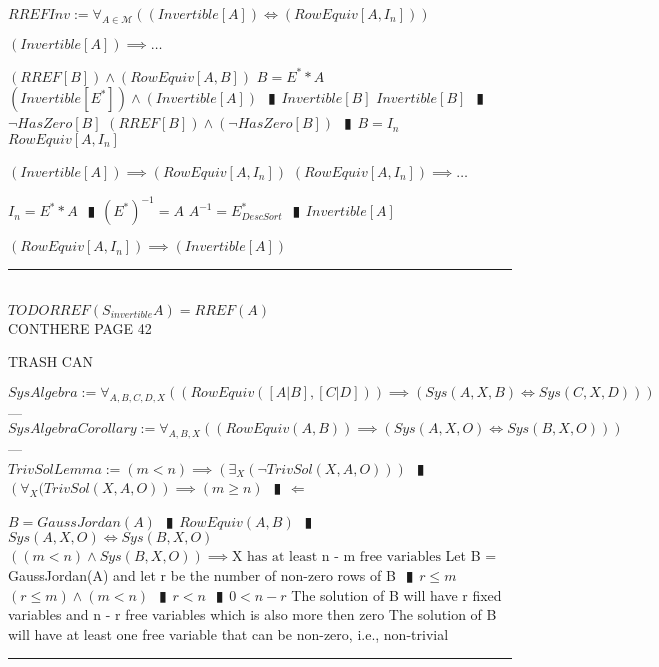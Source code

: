 \documentclass{book}
\newcommand{\abr}{:=}
\newcommand{\pipe}{$\phantom{(}\vrectangleblack\phantom{)}$}
\newcommand{\pr}[1]{\left(#1\right)}
\begin{document}
$RREFInv \abr \forall_{A \in \mathcal{M}}\pr{(Invertible[A]) \iff (RowEquiv[A, I_n])}$
\begin{enumerate}
  \lit $(Invertible[A]) \implies \ldots$
  \begin{enumerate}
    \lit $(RREF[B]) \land (RowEquiv[A, B])$
    \lit $B = E^* * A$
    \lit $(Invertible[E^*]) \land (Invertible[A])$ \pipe $Invertible[B]$
    \lit $Invertible[B]$ \pipe $\lnot HasZero[B]$
    \lit $(RREF[B]) \land (\lnot HasZero[B])$ \pipe $B = I_n$
    \lit $RowEquiv[A, I_n]$
  \end{enumerate}
  \lit $(Invertible[A]) \implies (RowEquiv[A, I_n])$
  \lit $(RowEquiv[A, I_n]) \implies \ldots$
  \begin{enumerate}
    \lit $I_n = E^* * A$ \pipe $(E^*)^{-1} = A$
    \lit $A^{-1} = E^*_{DescSort}$ \pipe $Invertible[A]$
  \end{enumerate}
  \lit $(RowEquiv[A, I_n]) \implies (Invertible[A])$
\end{enumerate} \vspace{.75mm} \hrule \vspace{.75mm} \ \\ 

$TODO RREF(S_{invertible} A) = RREF(A)$ \\

CONTHERE PAGE 42

TRASH CAN





$SysAlgebra \abr \forall_{A, B, C, D, X}\pr{\pr{RowEquiv([A|B], [C|D])} \implies \pr{Sys(A, X, B) \iff Sys(C, X, D)}}$    \phantom{TODO}--- \\
$SysAlgebraCorollary \abr \forall_{A, B, X}\pr{\pr{RowEquiv(A, B)} \implies \pr{Sys(A, X, O) \iff Sys(B, X, O)}}$    \phantom{TODO}--- \\
$TrivSolLemma \abr (m < n) \implies \pr{\exists_{X}\pr{\lnot TrivSol(X, A, O)}}$ \pipe $\pr{\forall_{X}(TrivSol(X, A, O)} \implies (m \geq n)$ \pipe $\Leftarrow$
\begin{enumerate}
  \lit $B = GaussJordan(A)$ \pipe $RowEquiv(A, B)$ \pipe $Sys(A, X, O) \iff Sys(B, X, O)$
  \lit $\pr{(m < n) \land Sys(B, X, O)} \implies \text{X has at least n - m free variables}$
  \lit Let B = GaussJordan(A) and let r be the number of non-zero rows of B \pipe $r \leq m$
  \lit $(r \leq m) \land (m < n)$ \pipe $r < n$ \pipe $0 < n - r$
  \lit The solution of B will have r fixed variables and n - r free variables which is also more then zero
  \lit The solution of B will have at least one free variable that can be non-zero, i.e., non-trivial
\end{enumerate} \vspace{.75mm} \hrule \vspace{.75mm} \ \\
\end{document}
